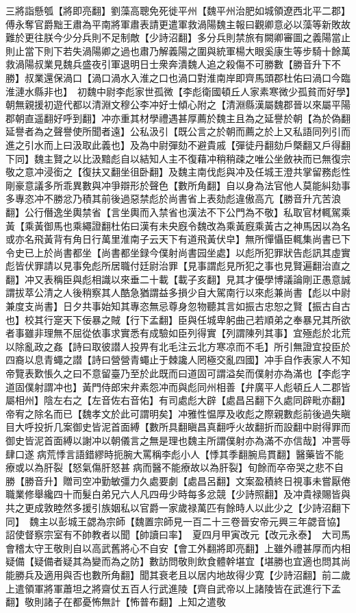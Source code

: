 三將詣懸瓠【將即亮翻】劉藻高聰免死徙平州【魏平州治肥如城領遼西北平二郡】傅永奪官爵黜王肅為平南將軍肅表請更遣軍救渦陽魏主報曰觀卿意必以藻等新敗故難於更往朕今少分兵則不足制敵【少詩沼翻】多分兵則禁旅有闕卿審圖之義陽當止則止當下則下若失渦陽卿之過也肅乃解義陽之圍與統軍楊大眼奚康生等步騎十餘萬救渦陽叔業見魏兵盛夜引軍退明日士衆奔潰魏人追之殺傷不可勝數【勝音升下不勝】叔業還保渦口【渦口渦水入淮之口也渦口對淮南岸即齊馬頭郡杜佑曰渦口今臨淮漣水縣非也】　初魏中尉李彪家世孤微【李彪衛國頓丘人家素寒微少孤貧而好學】朝無親援初遊代都以清淵文穆公李冲好士傾心附之【清淵縣漢屬魏郡晉以來屬平陽郡朝直遥翻好呼到翻】冲亦重其材學禮遇甚厚薦於魏主且為之延譽於朝【為於偽翻延譽者為之聲譽使所聞者遠】公私汲引【既公言之於朝而薦之於上又私語同列引而進之引水而上曰汲取此義也】及為中尉彈劾不避貴戚【彈徒丹翻劾戶槩翻又戶得翻下同】魏主賢之以比汲黯彪自以結知人主不復藉冲稍稍疎之唯公坐斂袂而已無復宗敬之意冲浸銜之【復扶又翻坐徂卧翻】及魏主南伐彪與冲及任城王澄共掌留務彪性剛豪意議多所乖異數與冲爭辯形於聲色【數所角翻】自以身為法官他人莫能糾劾事多專恣冲不勝忿乃積其前後過惡禁彪於尚書省上表劾彪違傲高亢【勝音升亢苦浪翻】公行僭逸坐輿禁省【言坐輿而入禁省也漢法不下公門為不敬】私取官材輒駕乘黃【乘黃御馬也乘繩證翻杜佑曰漢有未央廐令魏改為乘黃廐乘黃古之神馬因以為名或亦名飛黃背有角日行萬里淮南子云天下有道飛黃伏皁】無所憚懾臣輒集尚書已下令史已上於尚書都坐【尚書都坐録今僕射尚書园坐處】以彪所犯罪狀告彪訊其虛實彪皆伏罪請以見事免彪所居職付廷尉治罪【見事謂彪見所犯之事也見賢遍翻治直之翻】冲又表稱臣與彪相識以來垂二十載【載子亥翻】見其才優學博議論剛正愚意誠謂拔萃公清之人後稍察其人酷急猶謂益多損少自大駕南行以來彪兼尚書【彪以中尉兼度支尚書】日夕共事始知其專恣無忌尊身忽物聽其言如振古忠恕之賢【振古自古也】校其行寔天下佞暴之賊【行下孟翻】臣與任城卑躬曲己若順弟之奉暴兄其所欲者事雖非理無不屈從依事求實悉有成驗如臣列得實【列謂陳列其事】宜殛彪於北荒以除亂政之姦【詩曰取彼譛人投畀有北毛注云北方寒凉而不毛】所引無證宜投臣於四裔以息青蠅之譛【詩曰營營青蠅止于棘讒人罔極交亂四國】冲手自作表家人不知帝覽表歎悵久之曰不意留臺乃至於此既而曰道固可謂溢矣而僕射亦為滿也【李彪字道固僕射謂冲也】黃門侍郎宋弁素怨冲而與彪同州相善【弁廣平人彪頓丘人二郡皆屬相州】陰左右之【左音佐右音佑】有司處彪大辟【處昌呂翻下久處同辟毗亦翻】帝宥之除名而已【魏孝文於此可謂明矣】冲雅性愠厚及收彪之際親數彪前後過失瞋目大呼投折几案御史皆泥首面縛【數所具翻瞋昌真翻呼火故翻折而設翻中尉得罪而御史皆泥首面縛以謝冲以朝儀言之無是理也魏主所謂僕射亦為滿不亦信哉】冲詈辱肆口遂病荒悸言語錯繆時扼腕大罵稱李彪小人【悸其季翻腕烏貫翻】醫藥皆不能療或以為肝裂【怒氣傷肝怒甚病而醫不能療故以為肝裂】旬餘而卒帝哭之悲不自勝【勝音升】贈司空冲勤敏彊力久處要劇【處昌呂翻】文案盈積終日視事未嘗厭倦職業修舉纔四十而髮白弟兄六人凡四毋少時每多忿競【少詩照翻】及冲貴禄賜皆與共之更成敦睦然多援引族姻私以官爵一家歲禄萬匹有餘時人以此少之【少詩沼翻下同】　魏主以彭城王勰為宗師【魏置宗師見一百二十三卷晉安帝元興三年勰音協】詔使督察宗室有不帥教者以聞【帥讀曰率】　夏四月甲寅改元【改元永泰】　大司馬會稽太守王敬則自以高武舊將心不自安【會工外翻將即亮翻】上雖外禮甚厚而内相疑備【疑備者疑其為變而為之防】數訪問敬則飲食體幹堪宜【堪勝也宜適也問其尚能勝兵及適用與否也數所角翻】聞其衰老且以居内地故得少寛【少詩沼翻】前二歲上遣領軍將軍蕭坦之將齋仗五百人行武進陵【齊自武帝以上諸陵皆在武進行下孟翻】敬則諸子在都憂怖無計【怖普布翻】上知之遣敬